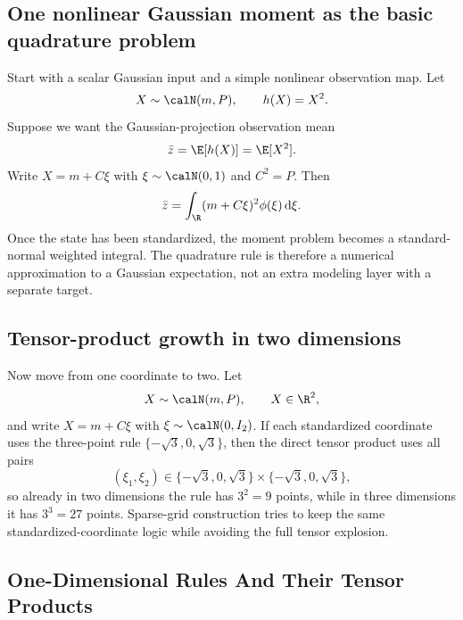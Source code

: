 \subsection{One nonlinear Gaussian moment as the basic quadrature problem}
\label{subsec:p34-scalar-motivation}

Start with a scalar Gaussian input and a simple nonlinear observation map.
Let
\begin{equation}
  X\sim\calN(m,P),
  \qquad
  h(X)=X^2.
  \label{eq:p34-scalar-gaussian-model}
\end{equation}
Suppose we want the Gaussian-projection observation mean
\begin{equation}
  \bar z = \E[h(X)] = \E[X^2].
  \label{eq:p34-scalar-target-mean}
\end{equation}
Write \(X=m+C\xi\) with \(\xi\sim\calN(0,1)\) and \(C^2=P\).  Then
\begin{equation}
  \bar z
  =
  \int_{\R} (m+C\xi)^2\phi(\xi)\dd\xi.
  \label{eq:p34-standardized-integral}
\end{equation}
Once the state has been standardized, the moment problem becomes a
standard-normal weighted integral.  The quadrature rule is therefore a numerical
approximation to a Gaussian expectation, not an extra modeling layer with a
separate target.

\subsection{Tensor-product growth in two dimensions}
\label{subsec:p34-2d-motivation}

Now move from one coordinate to two.  Let
\begin{equation}
  X\sim\calN(m,P),
  \qquad X\in\R^2,
  \label{eq:p34-2d-gaussian}
\end{equation}
and write \(X=m+C\xi\) with \(\xi\sim\calN(0,I_2)\).  If each standardized
coordinate uses the three-point rule \(\{-\sqrt3,0,\sqrt3\}\), then the direct
tensor product uses all pairs
\begin{equation}
  (\xi_1,\xi_2)
  \in
  \{-\sqrt3,0,\sqrt3\}\times\{-\sqrt3,0,\sqrt3\},
  \label{eq:p34-2d-tensor-points}
\end{equation}
so already in two dimensions the rule has \(3^2=9\) points, while in three
dimensions it has \(3^3=27\) points.  Sparse-grid construction tries to keep the
same standardized-coordinate logic while avoiding the full tensor explosion.

\subsection{One-Dimensional Rules And Their Tensor Products}
\label{sec:p31-ghq}

